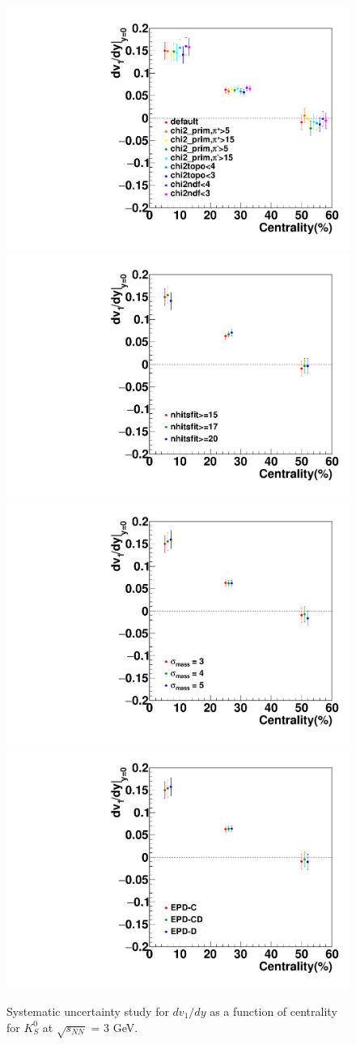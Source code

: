 \begin{figure}[h]
\includegraphics[width=0.49\linewidth]{chapterX/fig/ks_sys_cut_vn.pdf}
\includegraphics[width=0.49\linewidth]{chapterX/fig/ks_sys_cut_vn_nhits.pdf}
\includegraphics[width=0.49\linewidth]{FXT3gev/chapterX/fig/ks_sys_cut_vn_msigma.pdf}
\includegraphics[width=0.49\linewidth]{FXT3gev/chapterX/fig/ks_sys_cut_vn_epdres.pdf}
\caption{Systematic uncertainty study for $dv_{1}/dy$ as a function of centrality for $K^0_S$ at $\sqrt{s_{NN}}$ = 3 GeV.}
\label{ks_dv1dy_sys}
\end{figure}

